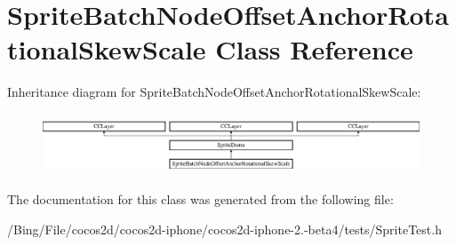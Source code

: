 \hypertarget{interface_sprite_batch_node_offset_anchor_rotational_skew_scale}{\section{Sprite\-Batch\-Node\-Offset\-Anchor\-Rotational\-Skew\-Scale Class Reference}
\label{interface_sprite_batch_node_offset_anchor_rotational_skew_scale}
}
Inheritance diagram for Sprite\-Batch\-Node\-Offset\-Anchor\-Rotational\-Skew\-Scale\-:\begin{figure}[H]
\begin{center}
\leavevmode
\includegraphics[height=1.818182cm]{interface_sprite_batch_node_offset_anchor_rotational_skew_scale}
\end{center}
\end{figure}


The documentation for this class was generated from the following file\-:\begin{DoxyCompactItemize}
\item 
/\-Bing/\-File/cocos2d/cocos2d-\/iphone/cocos2d-\/iphone-\/2.-\/beta4/tests/Sprite\-Test.\-h\end{DoxyCompactItemize}
